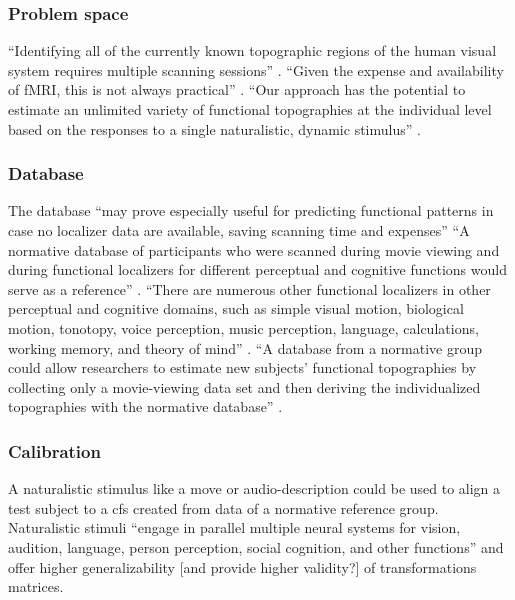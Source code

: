 

\subsubsection{Problem space}

``Identifying all of the currently known topographic regions of the human visual
system requires multiple scanning sessions'' \citep{wang2015probabilistic}.
%
``Given the expense and availability of fMRI, this is not always practical''
\citep{wang2015probabilistic}.
%
``Our approach has the potential to estimate an unlimited variety of functional
topographies at the individual level based on the responses to a single
naturalistic, dynamic stimulus'' \citep{jiahui2020predicting}.



\subsubsection{Database}
%
The database ``may prove especially useful for predicting functional patterns in
case no localizer data are available, saving scanning time and expenses''
\citep{rosenke2021probabilistic}
%
``A normative database of participants who were scanned during movie viewing and
during functional localizers for different perceptual and cognitive functions
would serve as a reference'' \citep{jiahui2020predicting}.
%
``There are numerous other functional localizers in other perceptual and
cognitive domains, such as simple visual motion, biological motion, tonotopy,
voice perception, music perception, language, calculations, working memory, and
theory of mind'' \citep{jiahui2020predicting}.
%
``A database from a normative group could allow researchers to estimate new
subjects' functional topographies by collecting only a movie-viewing data set
and then deriving the individualized topographies with the normative database''
\citep{jiahui2020predicting}.



\subsubsection{Calibration}
%
A naturalistic stimulus like a move or audio-description could be used to align
a test subject to a \ac{cfs} created from data of a normative reference group.
%
Naturalistic stimuli ``engage in parallel multiple neural systems for vision,
audition, language, person perception, social cognition, and other functions''
\citep{jiahui2020predicting} and offer higher generalizability [and provide
higher validity?] of transformations matrices.




